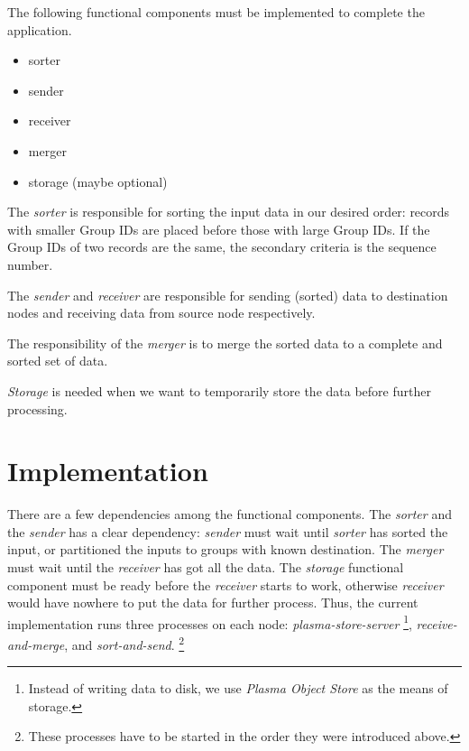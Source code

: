 \documentclass{article}
\begin{document}
The following functional components must be implemented to complete the application.
\begin{itemize}
    \item sorter
    \item sender
    \item receiver
    \item merger
    \item storage (maybe optional)
\end{itemize}

The \textit{sorter} is responsible for sorting the input data in our desired order: records with smaller Group IDs are placed before those with large Group IDs.
If the Group IDs of two records are the same, the secondary criteria is the sequence number.

The \textit{sender} and \textit{receiver} are responsible for sending (sorted) data to destination nodes and receiving data from source node respectively.

The responsibility of the \textit{merger} is to merge the sorted data to a complete and sorted set of data.

\textit{Storage} is needed when we want to temporarily store the data before further processing.

\section{Implementation}
There are a few dependencies among the functional components.
The \textit{sorter} and the \textit{sender} has a clear dependency: \textit{sender} must wait until \textit{sorter} has sorted the input, or partitioned the inputs to groups with known destination.
The \textit{merger} must wait until the \textit{receiver} has got all the data.
The \textit{storage} functional component must be ready before the \textit{receiver} starts to work, otherwise \textit{receiver} would have nowhere to put the data for further process.
Thus, the current implementation runs three processes on each node: \textit{plasma-store-server}
\footnote{Instead of writing data to disk, we use \textit{Plasma Object Store} as the means of storage.}, 
\textit{receive-and-merge}, and \textit{sort-and-send}.
\footnote{These processes have to be started in the order they were introduced above.}
\end{document}
